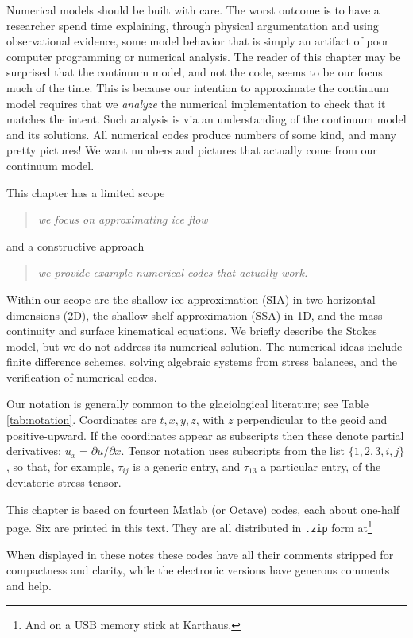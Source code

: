 \documentclass[titlepage,letterpaper,final,12pt]{scrartcl}
\begin{document}
Numerical models should be built with care.  The worst outcome is to have a researcher spend time explaining, through physical argumentation and using observational evidence, some model behavior that is simply an artifact of poor computer programming or numerical analysis.  The reader of this chapter may be surprised that the continuum model, and not the code, seems to be our focus much of the time.  This is because our intention to approximate the continuum model requires that we \emph{analyze} the numerical implementation to check that it matches the intent.  Such analysis is via an understanding of the continuum model and its solutions.  All numerical codes produce numbers of some kind, and many pretty pictures!  We want numbers and pictures that actually come from our continuum model.

This chapter has a limited scope
  \begin{quote}\emph{we focus on approximating ice flow}\end{quote}
and a constructive approach
  \begin{quote}\emph{we provide example numerical codes that actually work.}\end{quote}

Within our scope are the shallow ice approximation (SIA) in two horizontal dimensions (2D), the shallow shelf approximation (SSA) in 1D, and the mass continuity and surface kinematical equations.  We briefly describe the Stokes model, but we do not address its numerical solution.  The numerical ideas include finite difference schemes, solving algebraic systems from stress balances, and the verification of numerical codes.

Our notation is generally common to the glaciological literature; see Table \ref{tab:notation}.  Coordinates are $t,x,y,z$, with $z$ perpendicular to the geoid and positive-upward.  If the coordinates appear as subscripts then these denote partial derivatives: $u_x = \partial u/\partial x$.  Tensor notation uses subscripts from the list $\{1,2,3,i,j\}$, so that, for example, $\tau_{ij}$ is a generic entry, and $\tau_{13}$ a particular entry, of the deviatoric stress tensor.

This chapter is based on fourteen Matlab (or Octave) codes, each about one-half page.  Six are printed in this text.  They are all distributed in \texttt{.zip} form at\footnote{And on a USB memory stick at Karthaus.}
\begin{quote}
\end{quote}
\noindent When displayed in these notes these codes have all their comments stripped for compactness and clarity, while the electronic versions have generous comments and help.
\end{document}
